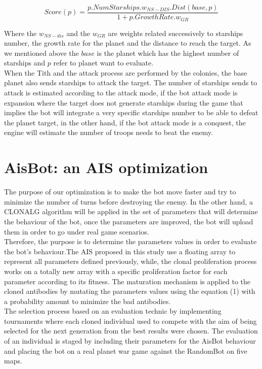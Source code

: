 \documentclass[]{interact}
\theoremstyle{plain}%
\theoremstyle{definition}
\theoremstyle{remark}
\begin{document}
\begin{equation}
Score(p) = \frac{p.NumStarships.w_{NS-DIS}.Dist(base,p)}{1+p.GrowthRate.w_{GR}}
\end{equation}

Where the $w_{NS-dis}$ and the $w_{GR}$ are weights related successively to starships number, the growth rate for the planet and the distance to reach the target. As we mentioned above the $base$ is the planet which has the highest number of starships and $p$ refer to planet want to evaluate. \\ 

When the Tith and the attack process are performed by the colonies, the base planet also sends starships to attack the target. The number of starships sends to attack is estimated according to the attack mode, if the bot attack mode is expansion where the target does not generate starships during the game that implies the bot will integrate a very specific starships number to be able to defeat the planet target, in the other hand, if the bot attack mode is a conquest, the engine will estimate the number of troops needs to beat the enemy.
\section{AisBot: an AIS optimization}
The purpose of our optimization is to make the bot move faster and try to minimize the number of turns before destroying the enemy. In the other hand, a CLONALG algorithm will be applied in the set of parameters that will determine the behaviour of the bot, once the parameters are improved, the bot will upload them in order to go under real game scenarios. \\

Therefore, the purpose is to determine the parameters values in order to evaluate the bot's behaviour.The AIS proposed in this study use a floating array to represent all parameters defined previously, while, the clonal proliferation process works on a totally new array with a specific proliferation factor for each parameter according to its fitness. The maturation mechanism is applied to the cloned antibodies by mutating the parameters values using the equation (1) with a probability amount to minimize the bad antibodies. \\

The selection process based on an evaluation technic by implementing tournaments where each cloned individual used to compete with the aim of being selected for the next generation from the best results were chosen. The evaluation of an individual is staged by including their parameters for the AisBot behaviour and placing the bot on a real planet war game against the RandomBot on five maps. \\
\end{document}
